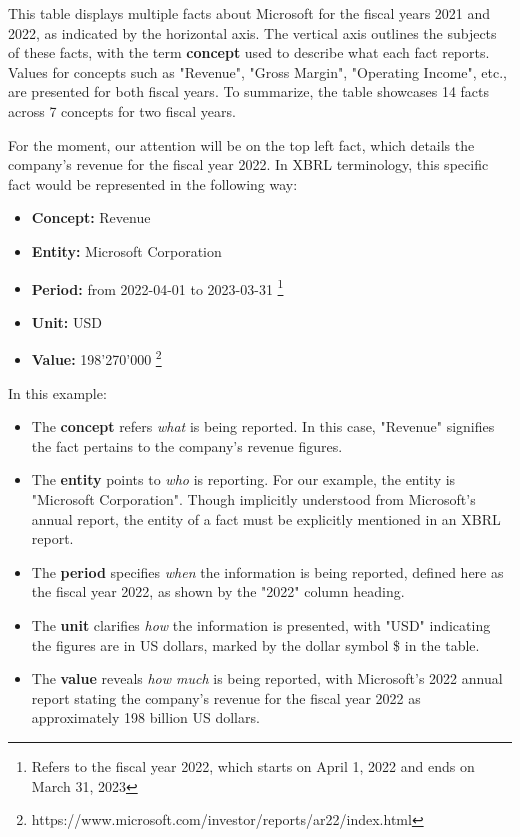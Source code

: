 This table displays multiple facts about Microsoft for the fiscal years 2021 and 2022, as indicated by the horizontal axis.
The vertical axis outlines the subjects of these facts, with the term \textbf{concept} used to describe what each fact reports.
Values for concepts such as "Revenue", "Gross Margin", "Operating Income", etc., are presented for both fiscal years.
To summarize, the table showcases 14 facts across 7 concepts for two fiscal years.

For the moment, our attention will be on the top left fact, which details the company's revenue for the fiscal year 2022.
In XBRL terminology, this specific fact would be represented in the following way:

\begin{itemize}
    \item \textbf{Concept:} Revenue
    \item \textbf{Entity:} Microsoft Corporation
    \item \textbf{Period:} from 2022-04-01 to 2023-03-31 \footnote{Refers to the fiscal year 2022, which starts on April 1, 2022 and ends on March 31, 2023}
    \item \textbf{Unit:} USD
    \item \textbf{Value:} 198'270'000 \footnote{https://www.microsoft.com/investor/reports/ar22/index.html}
\end{itemize}

In this example:

\begin{itemize}
    \item The \textbf{concept} refers \textit{what} is being reported. 
    In this case, "Revenue" signifies the fact pertains to the company's revenue figures.
    \item The \textbf{entity} points to \textit{who} is reporting. 
    For our example, the entity is "Microsoft Corporation".
    Though implicitly understood from Microsoft's annual report,
    the entity of a fact must be explicitly mentioned in an XBRL report.
    \item The \textbf{period} specifies \textit{when} the information is being reported,
    defined here as the fiscal year 2022, as shown by the "2022" column heading.
    \item The \textbf{unit} clarifies \textit{how} the information is presented,
    with "USD" indicating the figures are in US dollars,
    marked by the dollar symbol \$ in the table.
    \item The \textbf{value} reveals \textit{how much} is being reported,
    with Microsoft's 2022 annual report stating the company's revenue for the fiscal year 2022 as approximately 198 billion US dollars.
\end{itemize}

